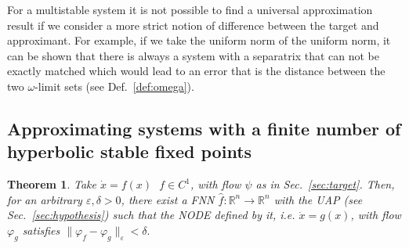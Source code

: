 \documentclass{article}
\newtheorem{theorem}{Theorem}
\theoremstyle{definition} \newtheorem{definition}{Definition}
\theoremstyle{remark} \newtheorem{remark}{Remark}
\newcommand{\reals}{\mathbb{R}}
\newcounter{ct}
\begin{document}
For a multistable system it is not possible to find a universal approximation result if we consider a more strict notion of difference between the target and approximant.
For example, if we take the uniform norm of the uniform norm, it can be shown that there is always a system with a separatrix that can not be exactly matched which would lead to an error that is the distance between the two $\omega$-limit sets (see Def.~\ref{def:omega}).





\subsection{Approximating systems with a finite number of hyperbolic stable fixed points}\label{sec:fp_theorem}

\begin{theorem}\label{thrm:approx}
Take $\dot x = f(x)   \ \ \ f\in C^1$, with flow $\psi$ as in Sec.~\ref{sec:target}.
Then, for an arbitrary $\varepsilon, \delta > 0$, there exist a FNN $\hat f: \reals^n\rightarrow\reals^n$ with the UAP (see Sec.~\ref{sec:hypothesis}) such that the NODE defined by it, i.e. $\dot x = g(x)$,
with flow $\varphi_g$ satisfies $\|\varphi_f- \varphi_g\|_\varepsilon < \delta.$
\end{theorem}

\end{document}
